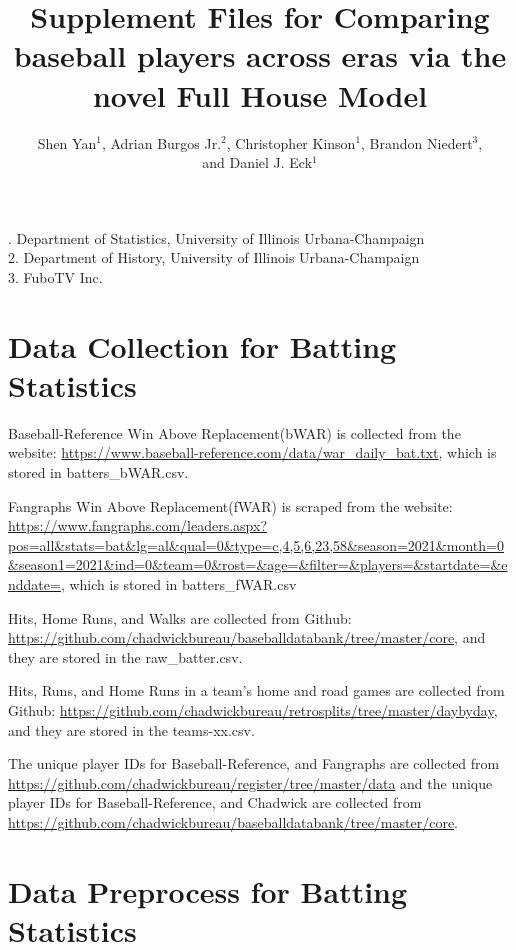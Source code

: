 \documentclass{article}
\title{Supplement Files for Comparing baseball players across eras via the novel Full House Model}
\author{Shen Yan$^1$, Adrian Burgos Jr.$^2$, Christopher Kinson$^1$, Brandon Niedert$^3$, \\and Daniel J. Eck$^1$}
\date{}
\begin{document}
\maketitle

{. Department of Statistics, University of Illinois Urbana-Champaign \\
2. Department of History, University of Illinois Urbana-Champaign \\
3. FuboTV Inc. \\}

\vspace*{0.25cm}

\section{Data Collection for Batting Statistics}

Baseball-Reference Win Above Replacement(bWAR) is collected from the website: \url{https://www.baseball-reference.com/data/war_daily_bat.txt}, which is stored in batters\_bWAR.csv. 

\bigskip

Fangraphs Win Above Replacement(fWAR) is scraped from the website: \url {https://www.fangraphs.com/leaders.aspx?pos=all&stats=bat&lg=al&qual=0&type=c,4,5,6,23,58&season=2021&month=0&season1=2021&ind=0&team=0&rost=&age=&filter=&players=&startdate=&enddate=}, which is stored in batters\_fWAR.csv

\bigskip

Hits, Home Runs, and Walks are collected from Github: \url{https://github.com/chadwickbureau/baseballdatabank/tree/master/core}, and they are stored in the raw\_batter.csv. 


\bigskip

Hits, Runs, and Home Runs in a team's home and road games are collected from Github: \url{https://github.com/chadwickbureau/retrosplits/tree/master/daybyday}, and they are stored in the teams-xx.csv. 

\bigskip

The unique player IDs for Baseball-Reference, and Fangraphs are collected from \url{https://github.com/chadwickbureau/register/tree/master/data} and the unique player IDs for Baseball-Reference, and Chadwick are collected from \url{https://github.com/chadwickbureau/baseballdatabank/tree/master/core}. 

 \section{Data Preprocess for Batting Statistics}
\end{document}
